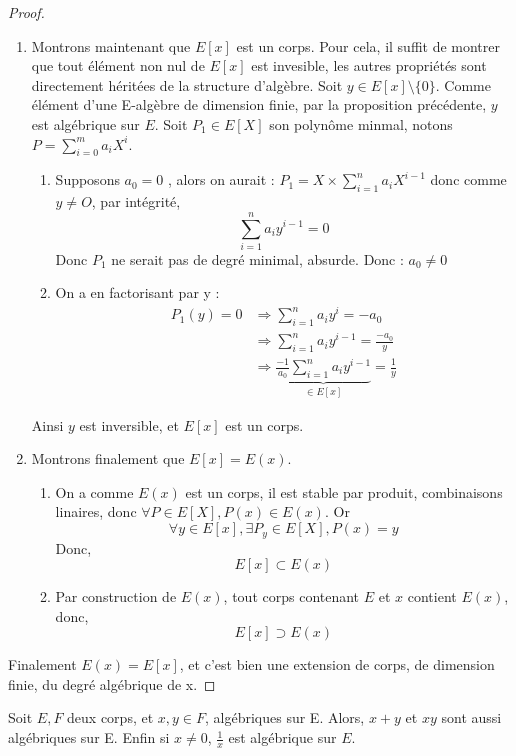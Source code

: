 \documentclass[a4paper,12pt,french,draft]{report}
\begin{document}
\begin{proof}
\begin{enumerate}
		\item Montrons maintenant que $E[x]$ est un corps. Pour cela, il suffit de montrer que tout élément non nul de  $E[x]$ est invesible, les autres propriétés sont directement héritées de la structure d'algèbre.
			Soit $y \in E[x]\setminus\{0\} $. Comme élément d'une E-algèbre de dimension finie, par la proposition précédente, $y$ est algébrique sur $E$. Soit \(P_{1} \in E[X]\) son polynôme minmal, notons \(P = \sum_{i=0}^{m}a_{i}X^{i}\).{}
			\begin{enumerate}
				\item Supposons $a_{0} = 0$ , alors on aurait : $P_{1} = X\times\sum_{i=1}^{n}a_{i}X^{i-1}$ donc comme $y \neq O$, par intégrité,
				\[{}
					\sum_{i=1}^{n}a_{i}y^{i-1} = 0
				\]
				Donc $P_{1}$ ne serait pas de degré minimal, absurde. Donc : $a_{0} \neq 0 $
			
				\item On a en factorisant par y :
				\[{}
					\begin{aligned}
						P_{1}(y) = 0 &\Rightarrow \sum_{i=1}^{n}a_{i}y^{i} = -a_{0}\\
									&\Rightarrow \sum_{i=1}^{n}a_{i}y^{i-1} = \frac{-a_{0}}{y}\\
									&\Rightarrow \underbrace{\frac{-1}{a_{0}}\sum_{i=1}^{n}a_{i}y^{i-1}}_{\in E[x]} = \frac{1}{y}
					\end{aligned}
				\]
			\end{enumerate}
			Ainsi $y$ est inversible, et $E[x]$ est un corps.
			
		\item Montrons finalement que $E[x] = E(x)$. 
			\begin{enumerate}
				\item On a comme $E(x)$ est un corps, il est stable par produit, combinaisons linaires, donc \(\forall P \in E[X], P(x) \in E(x)\). Or \[ \forall y \in E[x], \exists P_{y} \in E[X], P(x) = y \] Donc,  \[E[x] \subset E(x)\]
				\item 
				Par construction de $E(x)$, tout corps contenant $E$ et $x$ contient \(E(x)\), donc, 
				\[ E[x] \supset E(x) \]
			\end{enumerate}
	\end{enumerate}
	Finalement \(E(x) = E[x]\), et c'est bien une extension de corps, de dimension finie, du degré algébrique de x.
				\end{proof}
				
		
		\begin{proposition}
			Soit $E,F$ deux corps, et $x,y \in F$, algébriques sur E. Alors, 
			$x+y$ et $xy$ sont aussi algébriques sur E. Enfin si $x\neq0$, $\frac{1}{x}$ est algébrique sur $E$. 
		\end{proposition}
		
\end{document}
